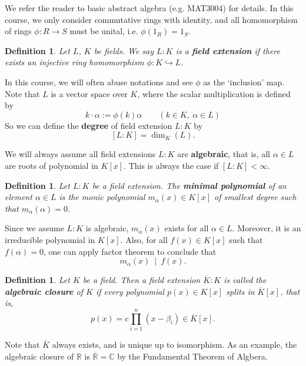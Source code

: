 \documentclass[11pt]{book}
\newtheorem{definition}[theorem]{Definition}
\begin{document}
We refer the reader to basic abstract algebra (e.g. MAT3004) for details. In this course, we only consider commutative rings with identity, and all homomorphism of rings $\phi: R \to S$ must be unital, i.e. $\phi(1_R) = 1_S$.

\begin{definition}
    Let $L$, $K$ be fields. We say $L:K$ is a {\bf field extension} if there exists an injective ring homomorphism $\phi: K \hookrightarrow L$.
\end{definition}
In this course, we will often abuse notations and see $\phi$ as the `inclusion' map. Note that $L$ is a vector space over $K$, where the scalar multiplication is defined by
$$k \cdot \alpha := \phi(k)\alpha \quad \quad (k \in K,\ \alpha \in L)$$
So we can define the {\bf degree} of field extension $L:K$ by
$$[L:K] = \dim_{K}(L).$$


We will always assume all field extensions $L:K$ are {\bf algebraic}, that is, all $\alpha \in L$ are roots of  polynomial in $K[x]$. This is always the case if $[L:K] < \infty$.
\begin{definition}
    Let $L:K$ be a field extension. The {\bf minimal polynomial} of an element $\alpha \in L$ is the monic polynomial $m_{\alpha}(x) \in K[x]$ of smallest degree such that $m_{\alpha}(\alpha) = 0$.
\end{definition}
Since we assume $L:K$ is algebraic, $m_{\alpha}(x)$ exists for all $\alpha \in L$. Moreover, it is an irreducible polynomial in $K[x]$. Also, for all $f(x) \in K[x]$ such that $f(\alpha) = 0$, one can apply factor theorem to conclude that
$$m_{\alpha}(x)\ \mid\ f(x).$$
\begin{definition}
    Let $K$ be a field. Then a field extension $\overline{K}:K$ is called the {\bf algebraic closure} of $K$ if every polynomial $p(x) \in K[x]$ splits in $\overline{K}[x]$, that is, 
    $$p(x) = c \prod_{i=1}^n(x - \beta_i) \in \overline{K}[x].$$
\end{definition}
Note that $\overline{K}$ always exists, and is unique up to isomorphism.
As an example, the algebraic closure of $\mathbb{R}$ is $\overline{\mathbb{R}} = \mathbb{C}$ by the Fundamental Theorem of Algbera. 
\end{document}
